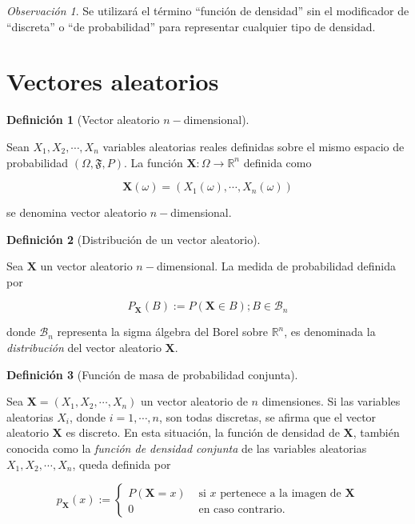\documentclass[
  us-letterpaper,
]{scrreprt}
\theoremstyle{definition}
\theoremstyle{plain}
\theoremstyle{plain}
\theoremstyle{definition}
\newtheorem{definition}{Definición}[chapter]
\theoremstyle{remark}
\newtheorem*{remark}{Observación}
\begin{document}
\begin{remark}
Se utilizará el término ``función de densidad'' sin el modificador de
``discreta'' o ``de probabilidad'' para representar cualquier tipo de
densidad.
\end{remark}

\section{Vectores aleatorios}\label{vectores-aleatorios}

\begin{definition}[Vector aleatorio
\(n-\)dimensional]\protect\hypertarget{def-randvec}{}\label{def-randvec}

Sean \(X_1,X_2,\cdots, X_n\) variables aleatorias reales definidas sobre
el mismo espacio de probabilidad \((\Omega, \mathfrak F, P)\). La
función \(\mathbf X:\Omega\to\mathbb R^n\) definida como

\[ \mathbf X(\omega)= (X_1(\omega),\cdots,X_n(\omega)) \]

se denomina vector aleatorio \(n-\)dimensional.

\end{definition}

\begin{definition}[Distribución de un vector
aleatorio]\protect\hypertarget{def-drv}{}\label{def-drv}

Sea \(\mathbf X\) un vector aleatorio \(n-\)dimensional. La medida de
probabilidad definida por

\[ P_{\mathbf X} (B) := P(\mathbf X\in B); B\in \mathcal B_n \]

donde \(\mathcal B_n\) representa la sigma álgebra del Borel sobre
\(\mathbb R^n\), es denominada la \emph{distribución} del vector
aleatorio \(\mathbf X\).

\end{definition}

\begin{definition}[Función de masa de probabilidad
conjunta]\protect\hypertarget{def-dcva}{}\label{def-dcva}

Sea \(\mathbf X= (X_1,X_2,\cdots,X_n)\) un vector aleatorio de \(n\)
dimensiones. Si las variables aleatorias \(X_i\), donde
\(i=1,\cdots,n\), son todas discretas, se afirma que el vector aleatorio
\(\mathbf X\) es discreto. En esta situación, la función de densidad de
\(\mathbf X\), también conocida como la \emph{función de densidad
conjunta} de las variables aleatorias \(X_1, X_2, \cdots, X_n\), queda
definida por

\[ p_\mathbf{X}(x):=\begin{cases}P(\mathbf X=x) & \text{ si } x \text{  pertenece a la imagen de } \mathbf X\\ 0 & \text{ en caso contrario. } \end{cases} \]

\end{definition}
\end{document}
